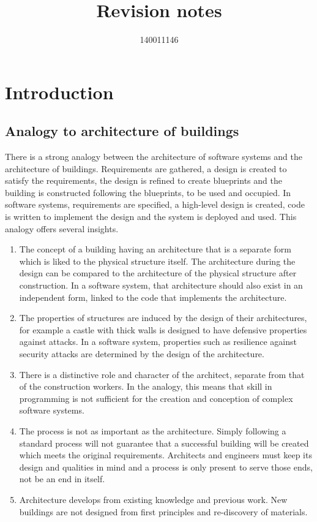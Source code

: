 \documentclass{sty/SizheArticle}
\title{Revision notes}
\author{140011146}
\begin{document}
\tableofcontents

\section{Introduction}
\subsection{Analogy to architecture of buildings}
There is a strong analogy between the architecture of software systems and the
architecture of buildings. Requirements are gathered, a design is created to
satisfy the requirements, the design is refined to create blueprints and
the building is constructed following the blueprints, to be used and occupied.
In software systems, requirements are specified, a high-level design is
created, code is written to implement the design and the system is deployed
and used. This analogy offers several insights.
\begin{enumerate}
\item The concept of a building having an architecture that is a separate form
which is liked to the physical structure itself. The architecture during the
design can be compared to the architecture of the physical structure after
construction. In a software system, that architecture should also exist in
an independent form, linked to the code that implements the architecture.
\item The properties of structures are induced by the design of their
architectures, for example a castle with thick walls is designed to have
defensive properties against attacks. In a software system, properties such
as resilience against security attacks are determined by the design of the
architecture.
\item There is a distinctive role and character of the architect, separate
from that of the construction workers. In the analogy, this means that skill
in programming is not sufficient for the creation and conception of complex
software systems.
\item The process is not as important as the architecture. Simply following
a standard process will not guarantee that a successful building will be
created which meets the original requirements. Architects and engineers must
keep its design and qualities in mind and a process is only present to serve 
those ends, not be an end in itself.
\item Architecture develops from existing knowledge and previous work. New
buildings are not designed from first principles and re-discovery of materials.
\end{enumerate}
\end{document}

